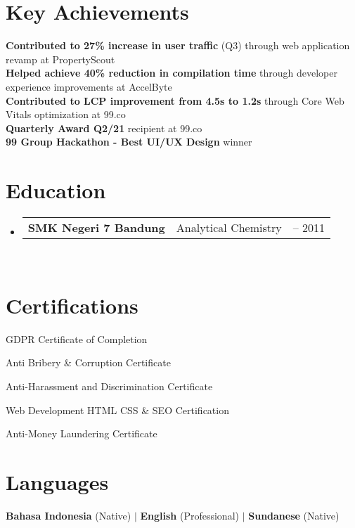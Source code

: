\documentclass[a4paper, 11pt]{article}
\newcommand{\resumeSubheading}[4]{
  \vspace{-2pt}\item
    \begin{tabularx}{0.987\textwidth}[t]{
  >{\raggedright\arraybackslash}X
  >{\centering\arraybackslash}X
  >{\raggedleft\arraybackslash}X }
      \textbf{#1} & #2 & #3 \\
    \end{tabularx}
    \textit{\small#4}\\
    \vspace{-7pt}
}
\newcommand{\resumeSubHeadingListStart}{\begin{itemize}[leftmargin=0.1in, label={}]}
\newcommand{\resumeSubHeadingListEnd}{\end{itemize}\vspace{5pt}}
\begin{document}
\section{Key Achievements}
\begin{itemize}[leftmargin=0.1in, label=$\bullet$]
    \small{\item{
        \textbf{Contributed to 27\% increase in user traffic} (Q3) through web application revamp at PropertyScout \\
        \textbf{Helped achieve 40\% reduction in compilation time} through developer experience improvements at AccelByte \\
        \textbf{Contributed to LCP improvement from 4.5s to 1.2s} through Core Web Vitals optimization at 99.co \\
        \textbf{Quarterly Award Q2/21} recipient at 99.co \\
        \textbf{99 Group Hackathon - Best UI/UX Design} winner
    }}
\end{itemize}

\section{Education}
    \resumeSubHeadingListStart
        \resumeSubheading
            {SMK Negeri 7 Bandung}{Analytical Chemistry}{2009 -- 2011}
            {}
    \resumeSubHeadingListEnd

\section{Certifications}
\begin{itemize}[leftmargin=0.1in, label=$\bullet$]
    \small{
        \item GDPR Certificate of Completion
        \item Anti Bribery \& Corruption Certificate
        \item Anti-Harassment and Discrimination Certificate
        \item Web Development HTML CSS \& SEO Certification
        \item Anti-Money Laundering Certificate
    }
\end{itemize}

\section{Languages}
\begin{itemize}[leftmargin=0.1in, label={}]
    \small{\item{
        \textbf{Bahasa Indonesia} (Native) $|$ \textbf{English} (Professional) $|$ \textbf{Sundanese} (Native)
    }}
\end{itemize}
\end{document}
